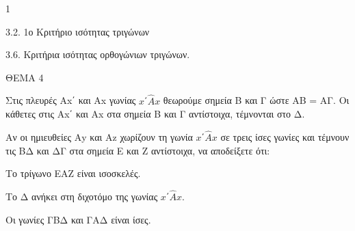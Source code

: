\begin{ylh}{1}
    \item 3.2. 1ο Κριτήριο ισότητας τριγώνων
    \item 3.6. Κριτήρια ισότητας ορθογώνιων τριγώνων.
\end{ylh}

ΘΕΜΑ 4

Στις πλευρές Αx΄ και Αx γωνίας $x΄\widehat{Α}x$ θεωρούμε σημεία Β και Γ ώστε ΑΒ = ΑΓ. Οι κάθετες στις Αx΄ και Αx στα σημεία Β και Γ αντίστοιχα, τέμνονται στο Δ.

Αν οι ημιευθείες Αy και Αz χωρίζουν τη γωνία $x΄\widehat{Α}x$ σε τρεις ίσες γωνίες και τέμνουν τις ΒΔ και ΔΓ στα σημεία Ε και Ζ αντίστοιχα, να αποδείξετε ότι:

\begin{alist}
\item Το τρίγωνο ΕΑΖ είναι ισοσκελές. 

\item Το Δ ανήκει στη διχοτόμο της γωνίας $x΄\widehat{Α}x$. 

\item Οι γωνίες ΓΒΔ και ΓΑΔ είναι ίσες. 


\end{alist}
